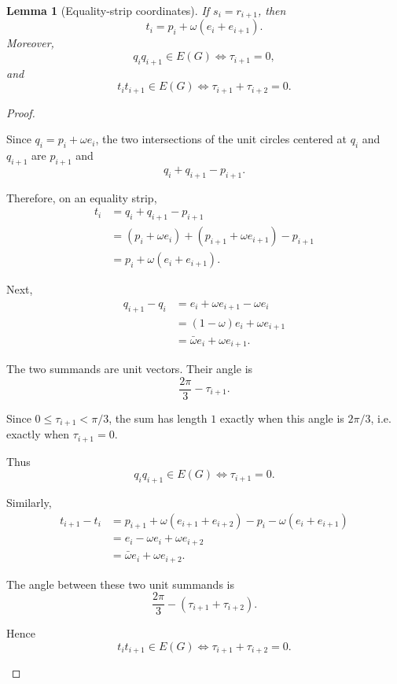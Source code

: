 \documentclass[11pt]{article}
\newtheorem{lemma}{Lemma}
\begin{document}
\begin{lemma}[Equality-strip coordinates]\label{lem:coordinates}
If $s_i=r_{i+1}$, then
\[
  t_i=p_i+\omega(e_i+e_{i+1}).
\]
Moreover,
\[
  q_iq_{i+1}\in E(G) \iff \tau_{i+1}=0,
\]
and
\[
  t_it_{i+1}\in E(G) \iff \tau_{i+1}+\tau_{i+2}=0.
\]
\end{lemma}

\begin{proof}
\begin{lamport}
\item Since $q_i=p_i+\omega e_i$, the two intersections of the unit circles centered at $q_i$ and $q_{i+1}$ are $p_{i+1}$ and
\[
  q_i+q_{i+1}-p_{i+1}.
\]
\item Therefore, on an equality strip,
\[
\begin{aligned}
  t_i
  &=q_i+q_{i+1}-p_{i+1}\\
  &=(p_i+\omega e_i)+(p_{i+1}+\omega e_{i+1})-p_{i+1}\\
  &=p_i+\omega(e_i+e_{i+1}).
\end{aligned}
\]
\item Next,
\[
\begin{aligned}
  q_{i+1}-q_i
  &=e_i+\omega e_{i+1}-\omega e_i\\
  &=(1-\omega)e_i+\omega e_{i+1}\\
  &=\bar\omega e_i+\omega e_{i+1}.
\end{aligned}
\]
\item The two summands are unit vectors. Their angle is
\[
  \frac{2\pi}{3}-\tau_{i+1}.
\]
\item Since $0\le \tau_{i+1}<\pi/3$, the sum has length $1$ exactly when this angle is $2\pi/3$, i.e. exactly when $\tau_{i+1}=0$.
\item Thus
\[
  q_iq_{i+1}\in E(G)\iff \tau_{i+1}=0.
\]
\item Similarly,
\[
\begin{aligned}
  t_{i+1}-t_i
  &=p_{i+1}+\omega(e_{i+1}+e_{i+2})-p_i-\omega(e_i+e_{i+1})\\
  &=e_i-\omega e_i+\omega e_{i+2}\\
  &=\bar\omega e_i+\omega e_{i+2}.
\end{aligned}
\]
\item The angle between these two unit summands is
\[
  \frac{2\pi}{3}-(\tau_{i+1}+\tau_{i+2}).
\]
\item Hence
\[
  t_it_{i+1}\in E(G)\iff \tau_{i+1}+\tau_{i+2}=0.
\]
\end{lamport}
\end{proof}
\end{document}
